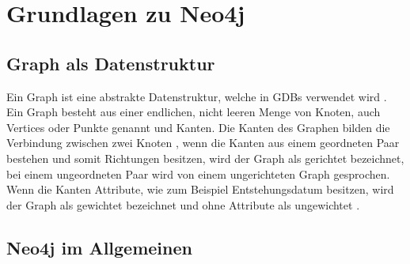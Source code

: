 
\chapter{Grundlagen zu Neo4j} %

\label{Kaptiel 2} %

\section{Graph als Datenstruktur}

Ein Graph ist eine abstrakte Datenstruktur, welche in GDBs verwendet wird \parencite{vicknair2010comparison}. Ein Graph besteht aus einer endlichen, nicht leeren Menge von Knoten, auch Vertices oder Punkte genannt und Kanten. Die Kanten des Graphen bilden die Verbindung zwischen zwei Knoten , wenn die Kanten aus einem geordneten Paar bestehen und somit Richtungen besitzen, wird der Graph als gerichtet bezeichnet, bei einem ungeordneten Paar wird von einem ungerichteten Graph gesprochen. Wenn die Kanten Attribute, wie zum Beispiel Entstehungsdatum besitzen, wird der Graph als gewichtet bezeichnet und ohne Attribute als ungewichtet \parencite{bondy1976graph}.

\section{Neo4j im Allgemeinen}

